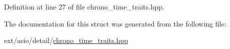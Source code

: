 Definition at line 27 of file chrono\+\_\+time\+\_\+traits.\+hpp.



The documentation for this struct was generated from the following file\+:\begin{DoxyCompactItemize}
\item 
ext/asio/detail/\hyperlink{chrono__time__traits_8hpp}{chrono\+\_\+time\+\_\+traits.\+hpp}\end{DoxyCompactItemize}
